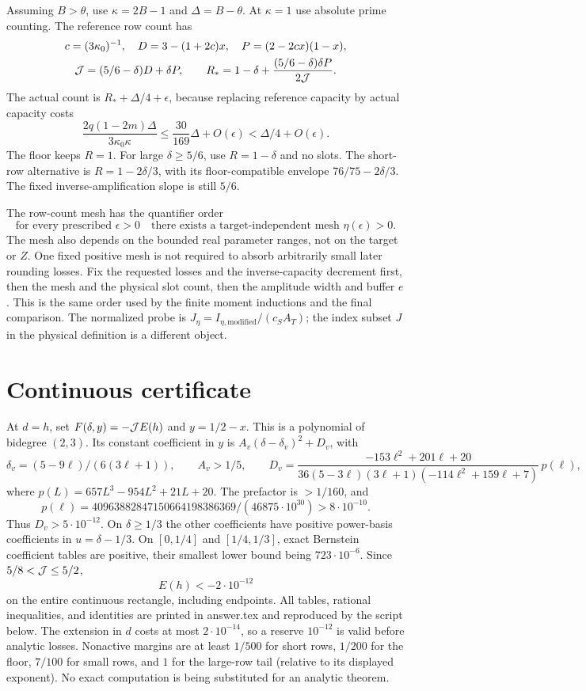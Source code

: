 \documentclass[12pt]{article}
\begin{document}
Assuming \(B>\theta\), use \(\kappa=2B-1\) and
\(\Delta=B-\theta\).  At \(\kappa=1\) use absolute prime counting.
The reference row count has
\[
\begin{gathered}
 c=(3\kappa_0)^{-1},\quad
 D=3-(1+2c)x,\quad P=(2-2cx)(1-x),\\
 {\cal J}=(5/6-\delta)D+\delta P,\qquad
 R_*=1-\delta+\frac{(5/6-\delta)\delta P}{2{\cal J}} .
\end{gathered}
\]
The actual count is \(R_*+\Delta/4+\epsilon\), because replacing
reference capacity by actual capacity costs
\[
 \frac{2q(1-2m)\Delta}{3\kappa_0\kappa}
 \le \frac{30}{169}\Delta+O(\epsilon)<\Delta/4+O(\epsilon).
\]
The floor keeps \(R=1\).  For large \(\delta\ge5/6\), use
\(R=1-\delta\) and no slots.  The short-row alternative is
\(R=1-2\delta/3\), with its floor-compatible envelope
\(76/75-2\delta/3\).
The fixed inverse-amplification slope is still \(5/6\).

The row-count mesh has the quantifier order
\[
 \text{for every prescribed }\epsilon>0
 \quad\text{there exists a target-independent mesh }\eta(\epsilon)>0.
\]
The mesh also depends on the bounded real parameter ranges, not
on the target or \(Z\).  One fixed positive mesh is not required to
absorb arbitrarily small later rounding losses.  Fix the requested
losses and the inverse-capacity decrement first, then the mesh and
the physical slot count, then the amplitude width and buffer \(e\).
This is the same order used by the finite moment inductions and
the final comparison.
The normalized probe is \(J_\eta=I_{\eta,\mathrm{modified}}/(c_SA_T)\);
the index subset \(J\) in the physical definition is a different object.

\section{Continuous certificate}
At \(d=h\), set \(F(\delta,y)=-{\cal J}E(h)\) and \(y=1/2-x\).
This is a polynomial of bidegree \((2,3)\).
Its constant coefficient in \(y\) is
\(A_v(\delta-\delta_v)^2+D_v\), with
\[
 \delta_v=(5-9\ell)/(6(3\ell+1)),\qquad
 A_v>1/5,\qquad
 D_v=\frac{-153\ell^2+201\ell+20}
 {36(5-3\ell)(3\ell+1)(-114\ell^2+159\ell+7)}\,p(\ell),
\]
where \(p(L)=657L^3-954L^2+21L+20\).
The prefactor is \(>1/160\), and
\[
 p(\ell)=40963882847150664198386369/
              (46875\cdot10^{30})>8\cdot10^{-10}.
\]
Thus \(D_v>5\cdot10^{-12}\).
On \(\delta\ge1/3\) the other coefficients have positive
power-basis coefficients in \(u=\delta-1/3\).
On \([0,1/4]\) and \([1/4,1/3]\), exact Bernstein coefficient
tables are positive, their smallest lower bound being
\(723\cdot10^{-6}\).
Since \(5/8<{\cal J}\le5/2\),
\[
 E(h)<-2\cdot10^{-12}
\]
on the entire continuous rectangle, including endpoints.
All tables, rational inequalities, and identities are printed in
answer.tex and reproduced by the script below.
The extension in \(d\) costs at most \(2\cdot10^{-14}\), so a
reserve \(10^{-12}\) is valid before analytic losses.
Nonactive margins are at least \(1/500\) for short rows,
\(1/200\) for the floor, \(7/100\) for small rows, and \(1\)
for the large-row tail (relative to its displayed exponent).
No exact computation is being substituted for an analytic theorem.
\end{document}

